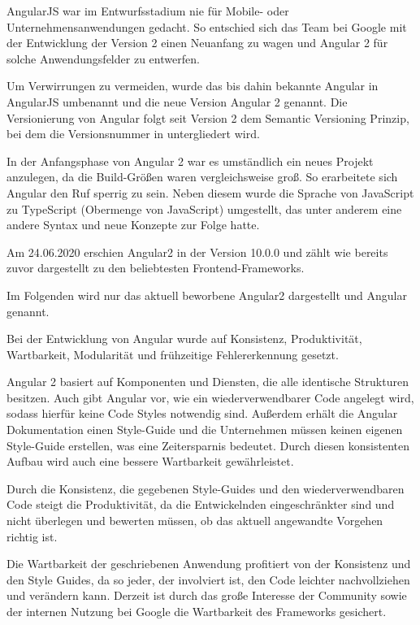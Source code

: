 AngularJS war im Entwurfsstadium nie für Mobile- oder Unternehmensanwendungen gedacht.
So entschied sich das Team bei Google mit der Entwicklung der Version 2 einen Neuanfang zu wagen und Angular 2 für solche Anwendungsfelder zu entwerfen. \cite{gaviganHistoryAngular2018}

Um Verwirrungen zu vermeiden, wurde das bis dahin bekannte Angular in AngularJS umbenannt und die neue Version Angular 2 genannt. Die Versionierung von Angular folgt seit Version 2 dem Semantic Versioning Prinzip, bei dem die Versionsnummer in  untergliedert wird. \cite{gaviganHistoryAngular2018} 

In der Anfangsphase von Angular 2 war es umständlich ein neues Projekt anzulegen, da die Build-Größen waren vergleichsweise groß. So erarbeitete sich Angular den Ruf sperrig zu sein.
Neben diesem wurde die Sprache von JavaScript zu TypeScript (Obermenge von JavaScript) umgestellt, das unter anderem eine andere Syntax und neue Konzepte zur Folge hatte. \cite{gaviganHistoryAngular2018}

Am 24.06.2020 erschien Angular2 in der Version 10.0.0 \cite{googleAngularAngularVersioning2020} und zählt wie bereits zuvor dargestellt zu den beliebtesten Frontend-Frameworks.

Im Folgenden wird nur das aktuell beworbene Angular2 dargestellt und Angular genannt.

Bei der Entwicklung von Angular wurde auf Konsistenz, Produktivität, Wartbarkeit, Modularität und frühzeitige Fehlererkennung gesetzt.

Angular 2 basiert auf Komponenten und Diensten, die alle identische Strukturen besitzen. Auch gibt Angular vor, wie ein wiederverwendbarer Code angelegt wird, sodass hierfür keine Code Styles notwendig sind. Außerdem erhält die Angular Dokumentation einen Style-Guide und die Unternehmen müssen keinen eigenen Style-Guide erstellen, was eine Zeitersparnis bedeutet. Durch diesen konsistenten Aufbau wird auch eine bessere Wartbarkeit gewährleistet. \cite{wahlinWesentlichenVorteileAngular2017}

Durch die Konsistenz, die gegebenen Style-Guides und den wiederverwendbaren Code steigt die Produktivität, da die Entwickelnden eingeschränkter sind und nicht überlegen und bewerten müssen, ob das aktuell angewandte Vorgehen richtig ist.  \cite{wahlinWesentlichenVorteileAngular2017}

Die Wartbarkeit der geschriebenen Anwendung profitiert von der Konsistenz und den Style Guides, da so jeder, der involviert ist, den Code leichter nachvollziehen und verändern kann. Derzeit ist durch das große Interesse der Community sowie der internen Nutzung bei Google die Wartbarkeit des Frameworks gesichert. \cite{wahlinWesentlichenVorteileAngular2017}

